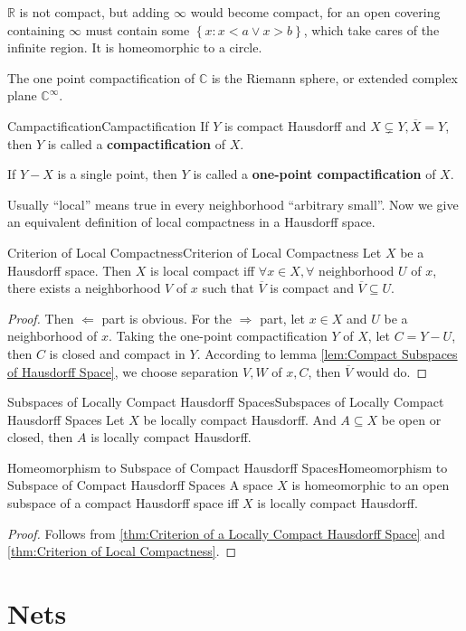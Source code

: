 \documentclass[../main.tex]{subfiles}
\begin{document}
\begin{remark}
$\mathbb{R}$ is not compact, but adding $\infty $ would become compact, for an open covering containing $\infty $ must contain some $\left\{ x:x<a\lor x>b \right\}$, which take cares of the infinite region. It is homeomorphic to a circle.

The one point compactification of $\mathbb{C}$ is the Riemann sphere, or extended complex plane $\mathbb{C}^{\infty }$.
\end{remark}

\begin{definition}{Campactification}{Campactification}
	If $Y$ is compact Hausdorff and $X \subsetneq Y, \overline{X}=Y$, then $Y$ is called a \textbf{compactification} of $X$. 

	If $Y-X$ is a single point, then $Y$ is called a \textbf{one-point compactification} of $X$.
\end{definition}

Usually ``local'' means true in every neighborhood ``arbitrary small''. Now we give an equivalent definition of local compactness in a Hausdorff space.

\begin{theorem}{Criterion of Local Compactness}{Criterion of Local Compactness}
	Let $X$ be a Hausdorff space. Then $X$ is local compact iff $\forall x\in X,\forall $ neighborhood $U$ of $x$, there exists a neighborhood $V$ of $x$ such that $\overline{V}$ is compact and $\overline{V} \subseteq U$.
\end{theorem}
\begin{proof}
	Then $\Leftarrow$ part is obvious. For the $\Rightarrow$ part, let $x\in X$ and $U$ be a neighborhood of $x$. Taking the one-point compactification $Y$ of $X$, let $C=Y-U$, then $C$ is closed and compact in $Y$. According to lemma \ref{lem:Compact Subspaces of Hausdorff Space}, we choose separation $V,W$ of $x,C$, then $\overline{V}$ would do. 
\end{proof}

\begin{corollary}{Subspaces of Locally Compact Hausdorff Spaces}{Subspaces of Locally Compact Hausdorff Spaces}
Let $X$ be locally compact Hausdorff. And $A \subseteq X$ be open or closed, then $A$ is locally compact Hausdorff.
\end{corollary}

\begin{corollary}{Homeomorphism to Subspace of Compact Hausdorff Spaces}{Homeomorphism to Subspace of Compact Hausdorff Spaces}
A space $X$ is homeomorphic to an open subspace of a compact Hausdorff space iff $X$ is locally compact Hausdorff.
\end{corollary}
\begin{proof}
	Follows from \ref{thm:Criterion of a Locally Compact Hausdorff Space} and \ref{thm:Criterion of Local Compactness}.
\end{proof}

\section{Nets}
\end{document}
